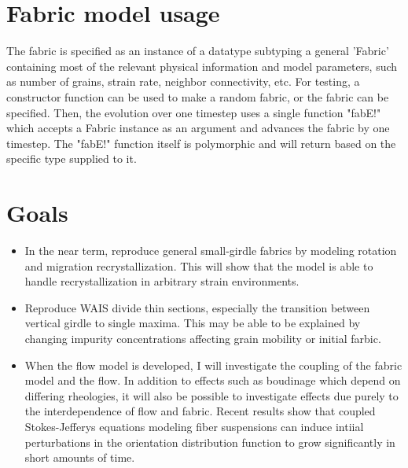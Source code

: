 \documentclass{article}
\begin{document}
\section{Fabric model usage}
The fabric is specified as an instance of a datatype subtyping a general 'Fabric' containing most of the relevant physical information and model parameters, such as number of grains, strain rate, neighbor connectivity, etc. For testing, a constructor function can be used to make a random fabric, or the fabric can be specified. Then, the evolution over one timestep uses a single function "fabE!" which accepts a Fabric instance as an argument and advances the fabric by one timestep. The "fabE!" function itself is polymorphic and will return based on the specific type supplied to it.

\section{Goals}
\begin{itemize}
\item In the near term, reproduce general small-girdle fabrics by modeling rotation and migration recrystallization. This will show that the model is able to handle recrystallization in arbitrary strain environments.

\item Reproduce WAIS divide thin sections, especially the transition between vertical girdle to single maxima. This may be able to be explained by changing impurity concentrations affecting grain mobility or initial farbic.

\item When the flow model is developed, I will investigate the coupling of the fabric model and the flow. In addition to effects such as boudinage which depend on differing rheologies, it will also be possible to investigate effects due purely to the interdependence of flow and fabric. Recent results \citep{montgomery-smith2011} show that coupled Stokes-Jefferys equations modeling fiber suspensions can induce intiial perturbations in the orientation distribution function to grow significantly in short amounts of time.
\end{itemize}


\end{document}
